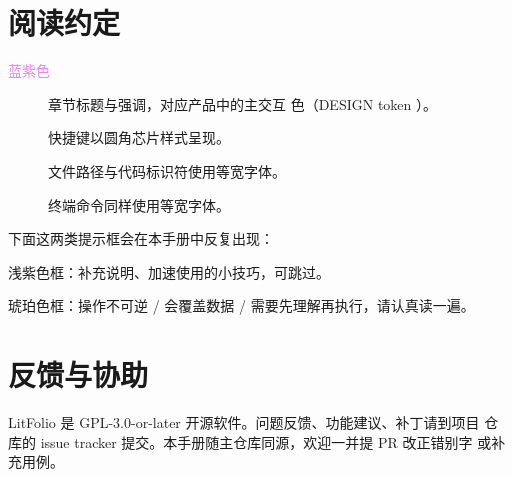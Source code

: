 \section*{阅读约定}

\begin{description}
  \item[\textcolor{violet}{蓝紫色}] 章节标题与强调，对应产品中的主交互
    色（DESIGN token ）。
  \item[] 快捷键以圆角芯片样式呈现。
  \item[] 文件路径与代码标识符使用等宽字体。
  \item[] 终端命令同样使用等宽字体。
\end{description}

下面这两类提示框会在本手册中反复出现：

\begin{tipbox}[提示]
浅紫色框：补充说明、加速使用的小技巧，可跳过。
\end{tipbox}

\begin{warnbox}[注意]
琥珀色框：操作不可逆 / 会覆盖数据 / 需要先理解再执行，请认真读一遍。
\end{warnbox}

\section*{反馈与协助}

LitFolio 是 GPL-3.0-or-later 开源软件。问题反馈、功能建议、补丁请到项目
仓库的 issue tracker 提交。本手册随主仓库同源，欢迎一并提 PR 改正错别字
或补充用例。
